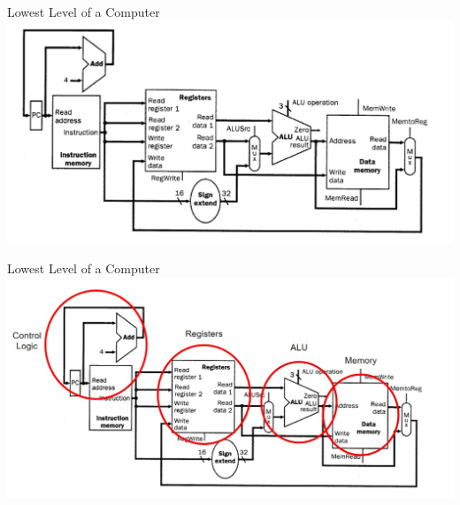 \documentclass[]{beamer}
\begin{document}
\begin{frame}{Lowest Level of a Computer}
    \includegraphics[width=\textwidth]{imgs/vis_3.jpg}
\end{frame}

\begin{frame}{Lowest Level of a Computer}
    \includegraphics[width=\textwidth]{imgs/vis_4.jpg}
\end{frame}
\end{document}
